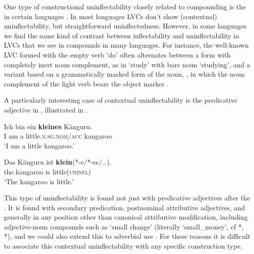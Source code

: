 \documentclass[output=paper,colorlinks,citecolor=brown]{langscibook}
\begin{document}
{\sloppy One  type of constructional uninflectability closely related to  compounding is the   in certain languages  \citep{spencer2020}. %
In  most languages LVCs don't show (contextual) uninflectability, but straightforward uninflectedness. However, in some languages we   find the same kind of contrast between inflectability and uninflectability in LVCs that we see in compounds in many languages. For instance, the well-known  LVC formed with the empty verb  `do' often alternates between a form with completely inert noun complement, as in  `study' with bare noun  `studying', and a variant based on a grammatically marked form of the noun,  , in which the noun complement of the light verb bears the object marker  \citep{miyamotokishimoto2016}.\par}

A particularly interesting case of contextual uninflectability is the predicative adjective in , illustrated in .

\ea \label{klein}
	\ea\label{kleines}
	\gll	Ich 	bin 	ein 	\textbf{kleines} 		Känguru.\\
	I 	am 	a 	little.\textsc{n.sg.nom/acc} 	kangaroo 		\\
	\glt	‘I am a little  kangaroo.’ 
	
	\ex\label{istklein}
	\gll	Das Känguru ist \textbf{klein}(*-e/*-es/\ldots).\\
	the kangaroo is little\textsc{(uninfl)}\\
	\glt	`The kangaroo is little.’										
\z
\z

This type of uninflectability is found not  just with predicative adjectives after the  . It is found with secondary predication, postnominal attributive adjectives, and generally in any position other than canonical attributive modification, including adjective-noun compounds such as  `small change' (literally `small\_money', cf *, *), and we could also extend this to adverbial use \citep{trost2006, durscheid2002}.  For these reasons it is difficult to associate this contextual uninflectability with any specific construction type. 
\end{document}
